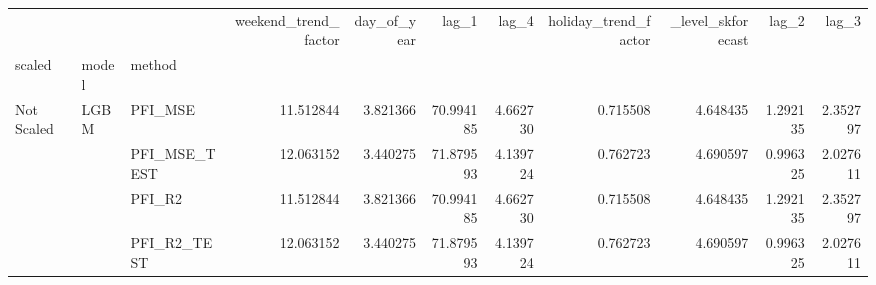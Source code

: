\begin{table}
\centering
\begin{tabular}{lllrrrrrrrr}
\toprule
 &  &  & weekend\_trend\_factor & day\_of\_year & lag\_1 & lag\_4 & holiday\_trend\_factor & \_level\_skforecast & lag\_2 & lag\_3 \\
scaled & model & method &  &  &  &  &  &  &  &  \\
\midrule
\multirow[c]{17}{*}{Not Scaled} & \multirow[c]{9}{*}{LGBM} & PFI\_MSE & {\cellcolor[HTML]{6B8DF0}} \color[HTML]{F1F1F1} 11.512844 & {\cellcolor[HTML]{485FD1}} \color[HTML]{F1F1F1} 3.821366 & {\cellcolor[HTML]{B40426}} \color[HTML]{F1F1F1} 70.994185 & {\cellcolor[HTML]{4B64D5}} \color[HTML]{F1F1F1} 4.662730 & {\cellcolor[HTML]{3B4CC0}} \color[HTML]{F1F1F1} 0.715508 & {\cellcolor[HTML]{4B64D5}} \color[HTML]{F1F1F1} 4.648435 & {\cellcolor[HTML]{3D50C3}} \color[HTML]{F1F1F1} 1.292135 & {\cellcolor[HTML]{4055C8}} \color[HTML]{F1F1F1} 2.352797 \\
 &  & PFI\_MSE\_TEST & {\cellcolor[HTML]{6C8FF1}} \color[HTML]{F1F1F1} 12.063152 & {\cellcolor[HTML]{455CCE}} \color[HTML]{F1F1F1} 3.440275 & {\cellcolor[HTML]{B40426}} \color[HTML]{F1F1F1} 71.879593 & {\cellcolor[HTML]{4961D2}} \color[HTML]{F1F1F1} 4.139724 & {\cellcolor[HTML]{3B4CC0}} \color[HTML]{F1F1F1} 0.762723 & {\cellcolor[HTML]{4B64D5}} \color[HTML]{F1F1F1} 4.690597 & {\cellcolor[HTML]{3B4CC0}} \color[HTML]{F1F1F1} 0.996325 & {\cellcolor[HTML]{3F53C6}} \color[HTML]{F1F1F1} 2.027611 \\
 &  & PFI\_R2 & {\cellcolor[HTML]{6B8DF0}} \color[HTML]{F1F1F1} 11.512844 & {\cellcolor[HTML]{485FD1}} \color[HTML]{F1F1F1} 3.821366 & {\cellcolor[HTML]{B40426}} \color[HTML]{F1F1F1} 70.994185 & {\cellcolor[HTML]{4B64D5}} \color[HTML]{F1F1F1} 4.662730 & {\cellcolor[HTML]{3B4CC0}} \color[HTML]{F1F1F1} 0.715508 & {\cellcolor[HTML]{4B64D5}} \color[HTML]{F1F1F1} 4.648435 & {\cellcolor[HTML]{3D50C3}} \color[HTML]{F1F1F1} 1.292135 & {\cellcolor[HTML]{4055C8}} \color[HTML]{F1F1F1} 2.352797 \\
 &  & PFI\_R2\_TEST & {\cellcolor[HTML]{6C8FF1}} \color[HTML]{F1F1F1} 12.063152 & {\cellcolor[HTML]{455CCE}} \color[HTML]{F1F1F1} 3.440275 & {\cellcolor[HTML]{B40426}} \color[HTML]{F1F1F1} 71.879593 & {\cellcolor[HTML]{4961D2}} \color[HTML]{F1F1F1} 4.139724 & {\cellcolor[HTML]{3B4CC0}} \color[HTML]{F1F1F1} 0.762723 & {\cellcolor[HTML]{4B64D5}} \color[HTML]{F1F1F1} 4.690597 & {\cellcolor[HTML]{3B4CC0}} \color[HTML]{F1F1F1} 0.996325 & {\cellcolor[HTML]{3F53C6}} \color[HTML]{F1F1F1} 2.027611 \\

\end{tabular}
\end{table}
